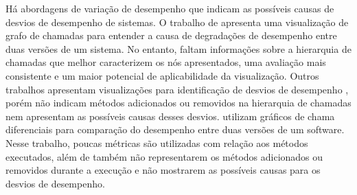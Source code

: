 Há abordagens de variação de desempenho que indicam as possíveis causas de desvios de desempenho de sistemas. O trabalho de \citeauthor{SandovalAlcocer2013} apresenta uma visualização de grafo de chamadas para entender a causa de degradações de desempenho entre duas versões de um sistema. No entanto, faltam informações sobre a hierarquia de chamadas que melhor caracterizem os nós apresentados, uma avaliação mais consistente e um maior potencial de aplicabilidade da visualização. Outros trabalhos apresentam visualizações para identificação de desvios de desempenho \cite{Bergel}\cite{Mostafa2009}, porém não indicam métodos adicionados ou removidos na hierarquia de chamadas nem apresentam as possíveis causas desses desvios. \citeauthor{Bezemer2015} utilizam gráficos de chama diferenciais para comparação do desempenho entre duas versões de um software. Nesse trabalho, poucas métricas são utilizadas com relação aos métodos executados, além de também não representarem os métodos adicionados ou removidos durante a execução e não mostrarem as possíveis causas para os desvios de desempenho.


